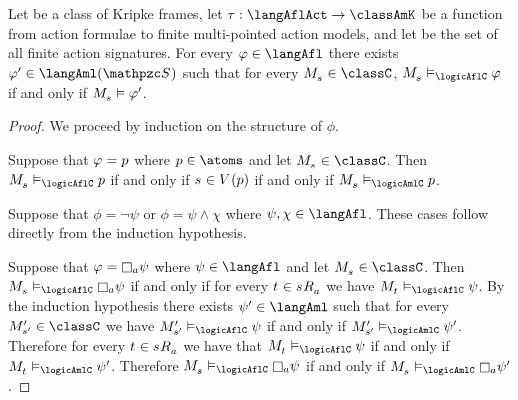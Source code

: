 \begin{proposition}
Let \classC{} be a class of Kripke frames, let $\tau : \langAflAct \to \classAmK$ be a function from action formulae to finite multi-pointed action models, and let \aSignatureFamily{} be the set of all finite action signatures.
For every $\phi \in \langAfl$ there exists $\phi' \in \langAml(\aSignatureFamily)$ such that for every $\kPModel{\kStateS} \in \classC$, $\kPModel{\kStateS} \entails_\logicAflC \phi$ if and only if $\kPModel{\kStateS} \entails \phi'$.
\end{proposition}

\begin{proof}
We proceed by induction on the structure of $\phi$.

Suppose that $\varphi = p$ where $\atomP \in \atoms$ and let $\kPModel{\kStateS} \in \classC$.
Then $\kPModel{\kStateS} \entails_\logicAflC \atomP$ if and only if $\kStateS \in \kValuation(\atomP)$ if and only if $\kPModel{\kStateS} \entails_\logicAmlC \atomP$.

Suppose that $\phi = \lnot \psi$ or $\phi = \psi \land \chi$ where $\psi, \chi \in \langAfl$.
These cases follow directly from the induction hypothesis.

Suppose that $\phi = \necessaryA \psi$ where $\psi \in \langAfl$ and let $\kPModel{\kStateS} \in \classC$.
Then $\kPModel{\kStateS} \entails_\logicAflC \necessaryA \psi$ if and only if for every $\kStateT \in \kSuccessorsA{\kStateS}$ we have $\kPModel{\kStateT} \entails_\logicAflC \psi$.
By the induction hypothesis there exists $\psi' \in \langAml$ such that for every $\kPModelP{\kStateSP} \in \classC$ we have $\kPModelP{\kStateSP} \entails_\logicAflC \psi$ if and only if $\kPModelP{\kStateSP} \entails_\logicAmlC \psi'$.
Therefore for every $\kStateT \in \kSuccessorsA{\kStateS}$ we have that $\kPModel{\kStateT} \entails_\logicAflC \psi$ if and only if $\kPModel{\kStateT} \entails_\logicAmlC \psi'$.
Therefore $\kPModel{\kStateS} \entails_\logicAflC \necessaryA \psi$ if and only if $\kPModel{\kStateS} \entails_\logicAmlC \necessaryA \psi'$.


\end{proof}
